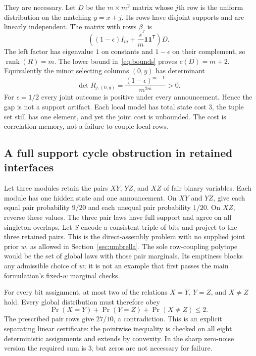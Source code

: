 \documentclass[11pt]{article}
\newcommand{\one}{\mathbf 1}
\newcommand{\rk}{\operatorname{rank}}
\theoremstyle{remark}
\begin{document}
They are necessary. Let $D$ be the $m\times m^2$ matrix whose $j$th row is the uniform distribution on the matching $y=x+j$. Its rows have disjoint supports and are linearly independent. The matrix with rows $\beta_j$ is
\[
 \left((1-\epsilon)I_m+\frac{\epsilon}{m}\one\one^{\mathsf T}\right)D.
\]
The left factor has eigenvalue $1$ on constants and $1-\epsilon$ on their complement, so $\rk(R)=m$. The lower bound in~\eqref{eq:bounds} proves $c(D)=m+2$. Equivalently the minor selecting columns $(0,y)$ has determinant
\begin{equation}\label{eq:minor}
 \det R_{j,(0,y)}=\frac{(1-\epsilon)^{m-1}}{m^{2m}}>0.
\end{equation}
For $\epsilon=1/2$ every joint outcome is positive under every announcement. Hence the gap is not a support artifact. Each local model has total state cost $3$, the tuple set still has one element, and yet the joint cost is unbounded. The cost is correlation memory, not a failure to couple local rows.

\subsection{A full support cycle obstruction in retained interfaces}

Let three modules retain the pairs $XY$, $YZ$, and $XZ$ of fair binary variables. Each module has one hidden state and one announcement. On $XY$ and $YZ$, give each equal pair probability $9/20$ and each unequal pair probability $1/20$. On $XZ$, reverse these values. The three pair laws have full support and agree on all singleton overlaps. Let $S$ encode a consistent triple of bits and project to the three retained pairs. This is the direct-assembly problem with no supplied joint prior $w$, as allowed in Section~\ref{sec:umbrella}. The sole row-coupling polytope would be the set of global laws with those pair marginals. Its emptiness blocks any admissible choice of $w$; it is not an example that first passes the main formulation's fixed-$w$ marginal checks.

For every bit assignment, at most two of the relations $X=Y$, $Y=Z$, and $X\ne Z$ hold. Every global distribution must therefore obey
\begin{equation}\label{eq:cycle-certificate}
 \Pr(X=Y)+\Pr(Y=Z)+\Pr(X\ne Z)\le2.
\end{equation}
The prescribed pair rows give $27/10$, a contradiction. This is an explicit separating linear certificate: the pointwise inequality is checked on all eight deterministic assignments and extends by convexity. In the sharp zero-noise version the required sum is $3$, but zeros are not necessary for failure.
\end{document}
